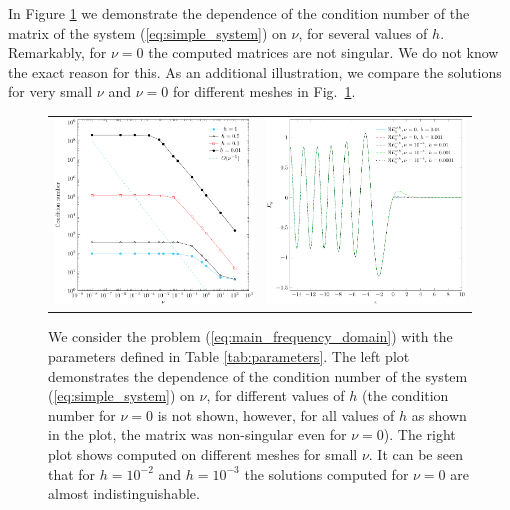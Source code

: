 In Figure \ref{fig:small_nu} we demonstrate the dependence of the condition number of the matrix of the system (\ref{eq:simple_system}) 
on $\nu$, for several values of $h$.
Remarkably, for $\nu=0$ the computed matrices are not singular. We do not know the exact reason for this.
As an additional illustration, we compare the solutions for very small $\nu$ and $\nu=0$ for different meshes in Fig.~\ref{fig:small_nu}. 
\begin{figure}[htb!]
\begin{tabular}{cc}
\includegraphics[height=0.32\textwidth]{pics_frequency_domain/fig_cond_num.pdf}&
 \includegraphics[height=0.32\textwidth]{pics_frequency_domain/ey_resonance.pdf}
 \end{tabular}
 \caption{
 We consider the problem (\ref{eq:main_frequency_domain}) with the parameters 
defined in Table \ref{tab:parameters}. The left plot demonstrates the dependence of the condition number of the system (\ref{eq:simple_system}) on $\nu$, for different values of $h$ (the condition 
 number for $\nu=0$ is not shown, however, for all values of $h$ as shown in the plot, the matrix was non-singular even for $\nu=0$). 
 The right plot shows  computed on different meshes for small $\nu$. It can be seen that for $h=10^{-2}$ and $h=10^{-3}$ the solutions 
 computed for $\nu=0$ are almost indistinguishable.}
 \label{fig:small_nu}
\end{figure}
